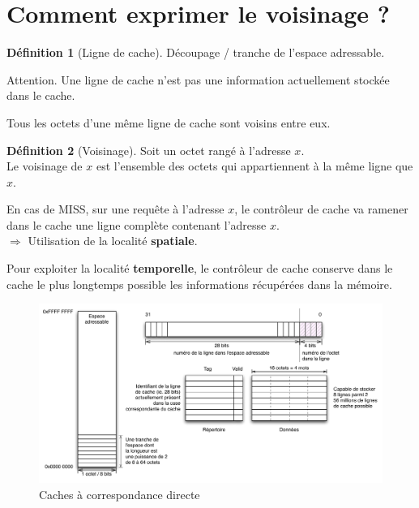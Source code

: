 \documentclass[11pt,english,french]{scrreprt}
\theoremstyle{remark}
\theoremstyle{definition}
\newtheorem*{def*}{Définition}
\begin{document}
\section{Comment exprimer le voisinage ?} %

\begin{def*}[Ligne de cache]
	Découpage / tranche de l'espace adressable.
	
	Attention. Une ligne de cache n'est pas une information actuellement stockée dans le cache.
\end{def*}

Tous les octets d'une même ligne de cache sont voisins entre eux. 

\begin{def*}[Voisinage]
	Soit un octet rangé à l'adresse $x$.\\
	Le voisinage de $x$ est l'ensemble des octets qui appartiennent à la même ligne que $x$.
\end{def*}

En cas de MISS, sur une requête à l'adresse $x$, le contrôleur de cache va ramener dans le cache une ligne complète contenant l'adresse $x$.\\
$\Rightarrow$ Utilisation de la localité \textbf{spatiale}.

Pour exploiter la localité \textbf{temporelle}, le contrôleur de cache conserve dans le cache le plus longtemps possible les informations récupérées dans la mémoire.

\begin{figure}[!h]
	\center
	\includegraphics[scale=.65]{diagrammes/cache}
	\caption{Caches à correspondance directe}
\end{figure}
\end{document}
